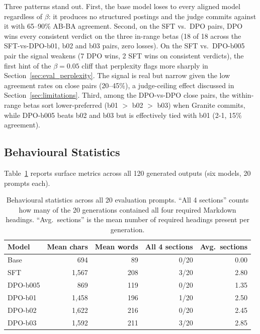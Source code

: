 \documentclass[../main.tex]{subfiles}
\begin{document}
Three patterns stand out. First, the base model loses to every aligned model regardless of $\beta$: it produces no structured postings and the judge commits against it with 65--90\% AB-BA agreement. Second, on the SFT vs.\ DPO pairs, DPO wins every consistent verdict on the three in-range betas (18 of 18 across the SFT-vs-DPO-b01, b02 and b03 pairs, zero losses). On the SFT vs.\ DPO-b005 pair the signal weakens (7 DPO wins, 2 SFT wins on consistent verdicts), the first hint of the $\beta=0.05$ cliff that perplexity flags more sharply in Section~\ref{sec:eval_perplexity}. The signal is real but narrow given the low agreement rates on close pairs (20--45\%), a judge-ceiling effect discussed in Section~\ref{sec:limitations}. Third, among the DPO-vs-DPO close pairs, the within-range betas sort lower-preferred (b01 $>$ b02 $>$ b03) when Granite commits, while DPO-b005 beats b02 and b03 but is effectively tied with b01 (2-1, 15\% agreement).

\subsection{Behavioural Statistics}
\label{sec:eval_behavioural}

Table~\ref{tab:behavioural} reports surface metrics across all 120 generated outputs (six models, 20 prompts each).

\begin{table}[h]
\centering
\small
\begin{tabular}{lrrrr}
\toprule
\textbf{Model} & \textbf{Mean chars} & \textbf{Mean words} & \textbf{All 4 sections} & \textbf{Avg.\ sections} \\
\midrule
Base           &   694 &  89 &  0/20 & 0.00 \\
SFT            & 1{,}567 & 208 &  3/20 & 2.80 \\
DPO-b005       &   869 & 119 &  0/20 & 1.35 \\
DPO-b01        & 1{,}458 & 196 &  1/20 & 2.50 \\
DPO-b02        & 1{,}622 & 216 &  0/20 & 2.45 \\
DPO-b03        & 1{,}592 & 211 &  3/20 & 2.85 \\
\bottomrule
\end{tabular}
\caption{Behavioural statistics across all 20 evaluation prompts. ``All 4 sections'' counts how many of the 20 generations contained all four required Markdown headings. ``Avg.\ sections'' is the mean number of required headings present per generation.}
\label{tab:behavioural}
\end{table}
\end{document}
